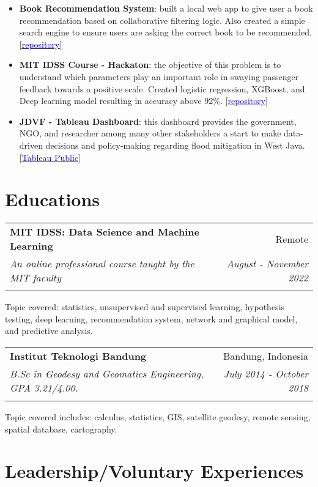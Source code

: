 \documentclass[a4paper, 11pt]{article}
\makeatletter
\newcommand{\resumeItem}[2]{
    \item\small{
        \textbf{#1}{: #2 \vspace{-2pt}}
    }
}
\newcommand{\resumeSubheading}[4]{
    \vspace{-1pt}
    \begin{tabular*}{0.97\textwidth}{l@{\extracolsep{\fill}}r}
        \color{lightblue}\textbf{#1} & #2 \\
        \textit{\small#3} & \textit{\small #4} \\
        \textnormal{}\vspace{-5pt}
    \end{tabular*}\vspace{-5pt}
}
\newcommand{\resumeItemListStart}{\begin{itemize}[leftmargin=*]\setlength\itemsep{0em}\vspace{-1pt}}
\newcommand{\resumeItemListEnd}{\end{itemize}\vspace{-5pt}}
\makeatother
\begin{document}
    \resumeItemListStart
    \resumeItem{Book Recommendation System}{built a local web app to give user a book recommendation based on collaborative filtering logic.
    Also created a simple search engine to ensure users are asking the correct book to be recommended. 
    \href{https://github.com/amrirasyidi/book_recommendation}{[\textcolor{blue}{repository}]}}
    \resumeItem{MIT IDSS Course - Hackaton}{the objective of this problem is to understand which parameters play an important role in swaying
    passenger feedback towards a positive scale. Created logistic regression, XGBoost, and Deep learning model resulting in accuracy
    above 92\%. 
    \href{https://github.com/amrirasyidi/mit_idss_hackaton}{[\textcolor{blue}{repository}]}}
    \resumeItem{JDVF - Tableau Dashboard}{this dashboard provides the government, NGO, and researcher among many other stakeholders a start
    to make data-driven decisions and policy-making regarding flood mitigation in West Java. 
    \href{https://public.tableau.com/app/profile/faisal.putra/viz/Book1_16671939458310/DashboardFINAL}{[\textcolor{blue}{Tableau Public}]}}
    \resumeItemListEnd
    
    \vspace{-5pt}
    \section{Educations}

    \resumeSubheading
    {MIT IDSS: Data Science and Machine Learning}
    {Remote}
    {An online professional course taught by the MIT faculty}
    {August - November 2022}
    {Topic covered: statistics, unsupervised and supervised learning, hypothesis testing, 
    deep learning, recommendation system, network and graphical model, and predictive analysis.}
    
    \vspace{5pt}
    \resumeSubheading
    {Institut Teknologi Bandung}
    {Bandung, Indonesia}
    {B.Sc in Geodesy and Geomatics Engineering, GPA 3.21/4.00.}
    {July 2014 - October 2018}
    {Topic covered includes: calculus, statistics, GIS, satellite geodesy, 
    remote sensing, spatial database, cartography.}

    \vspace{-5pt}
    \section{Leadership/Voluntary Experiences}
\end{document}
